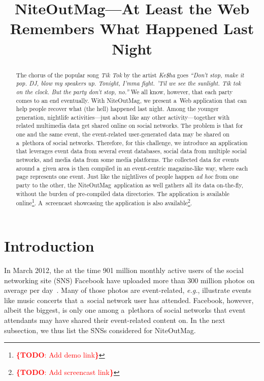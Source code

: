 \documentclass{acm_proc_article-sp}
\let\oldemph\emph
\renewcommand{\emph}[1]{\oldemph{\fontsize{9}{9}\selectfont #1}}
\newcommand{\todo}[1]{\noindent\textcolor{red}{{\bf \{TODO}: #1{\bf \}}}}
\begin{document}
\title{NiteOutMag\hspace{-1.5pt}---At Least the Web\\ Remembers What Happened Last Night}

\author{
}
\maketitle

\begin{abstract}
The chorus of the popular song \emph{Tik Tok} by the artist \emph{Ke\$ha} goes
\emph{``Don't stop, make it pop. DJ, blow my speakers up. Tonight, I'mma fight.
'Til we see the sunlight. Tik tok on the clock. But the party don't stop, no.''}
We all know, however, that each party comes to an end eventually.
With NiteOutMag\texttrademark, we present a~Web application
that can help people recover what (the hell) happened last night.
Among the younger generation, nightlife activities---just about like any other
activity---together with related multimedia data get shared online on social networks.
The problem is that for one and the same event, the event-related user-generated data
may be shared on a~plethora of social networks.
Therefore, for this challenge, we introduce an application
that leverages event data from several event databases,
social data from multiple social networks, and media data from some media platforms.
The collected data for events around a~given area is then compiled
in an event-centric magazine-like way, where each page represents one event.
Just like the nightlives of people happen \emph{ad hoc} from one party to the other,
the NiteOutMag\texttrademark~application as well
gathers all its data on-the-fly, without the burden of pre-compiled data directories.
The application is available online\footnote{\todo{Add demo link}}.
A~screencast showcasing the application is also available\footnote{\todo{Add screencast link}}.
\end{abstract}




\section{Introduction}
In March 2012, the at the time 901 million monthly active users
of the social networking site (SNS) Facebook
have uploaded more than 300 million photos on average per day~\cite{Facebook2012}.
Many of those photos are event-related, \emph{e.g.},
illustrate events like music concerts that a~social network user has attended.
Facebook, however, albeit the biggest, is only one among a~plethora of social networks
that event attendants may have shared their event-related content on.
In the next subsection, we thus list the SNSs considered for
NiteOutMag\texttrademark.
\end{document}
